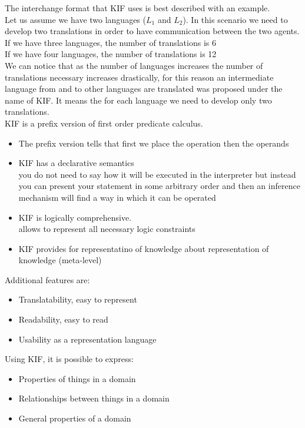 The interchange format that KIF uses is best described with an example.\\
Let us assume we have two languages ($L_1$ and $L_2$). In this scenario we need to develop two translations in order to have communication between the two agents.\\
If we have three languages, the number of translations is 6\\
If we have four languages, the number of translations is 12\\

We can notice that as the number of languages increases the number of translations necessary increases drastically, for this reason an intermediate language from and to other languages are translated was proposed under the name of KIF.
It means the for each language we need to develop only two translations. \\

KIF is a prefix version of first order predicate calculus.
\begin{itemize}
\item The prefix version tells that first we place the operation then the operands 
\item KIF has a declarative semantics\\
you do not need to say how it will be executed in the interpreter but instead you can present your statement in some arbitrary order and then an inference mechanism will find a way in which it can be operated
\item KIF is logically comprehensive.\\
allows to represent all necessary logic constraints
\item KIF provides for representatino of knowledge about representation of knowledge (meta-level)
\end{itemize}
Additional features are:
\begin{itemize}
\item Translatability, easy to represent
\item Readability, easy to read
\item Usability as a representation language 
\end{itemize}

Using KIF, it is possible to express:
\begin{itemize}
\item Properties of things in a domain
\item Relationships between things in a domain
\item General properties of a domain
\end{itemize}

